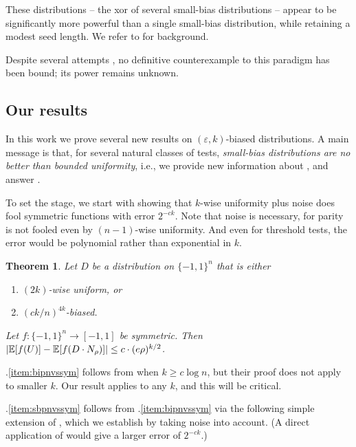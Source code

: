 \documentclass[10pt,a4paper]{article}
\newtheorem{theorem}{Theorem}%
\theoremstyle{definition}
\newcommand{\E}{\mathop{\mathbb{E}\/}}
\newcommand{\pmo}{\{-1,1\}}
\DeclarePairedDelimiter\abs{\lvert}{\rvert}
\def\epsilon{\varepsilon}
\newcommand{\e}{\epsilon}
\begin{document}
These distributions -- the xor of several small-bias distributions -- appear to
be significantly more powerful than a single small-bias distribution, while retaining
a modest seed length.  We refer to
\cite{ODonnell14, corr-survey, DBLP:journals/eccc/HatamiH23, moti} for background.

Despite several attempts \cite{BDVY08,MZ09,LV-sum}, no definitive counterexample to this paradigm has been bound; its power remains unknown.

\subsection{Our results}

In this work we prove several new results on $(\e,k)$-biased distributions.  A main message is that, for several natural classes of tests, \emph{small-bias distributions are no better than bounded uniformity}, i.e., we provide new information about , and answer .

To set the stage, we start with showing that $k$-wise uniformity plus noise does fool symmetric functions with error $2^{-ck}$.  Note that noise is necessary, for parity is not fooled even by $(n-1)$-wise uniformity.  And even for threshold tests, the error would be polynomial \cite{DGJSV-bifh,benjamini2012kwise} rather than exponential in $k$.

\begin{theorem} \label{thm:bipnvssym}
Let $D$ be a distribution on $\pmo^n$ that is either
\begin{enumerate}[label=(\roman*),itemsep=2pt,parsep=0pt,topsep=2pt]
  \item \label{item:bipnvssym} $(2k)$-wise uniform, or
  \item \label{item:sbpnvssym} $(ck/n)^{4k}$-biased.
\end{enumerate}
Let $f\colon\pmo^n \to [-1,1]$ be symmetric.  Then $\abs{\E[f(U)] - \E[f(D \cdot N_\rho)] } \le c \cdot (e\rho)^{k/2}$.
\end{theorem}

.\ref{item:bipnvssym} follows from \cite{ForbesKelley-2018} when $k\ge c\log n$, but their proof does not apply to smaller $k$.  Our result applies to any $k$, and this will be critical.

.\ref{item:sbpnvssym} follows from .\ref{item:bipnvssym} via the following simple extension of , which we establish by taking noise into account.  (A direct application of  would give a larger error of $2^{-ck}$.)
\end{document}
